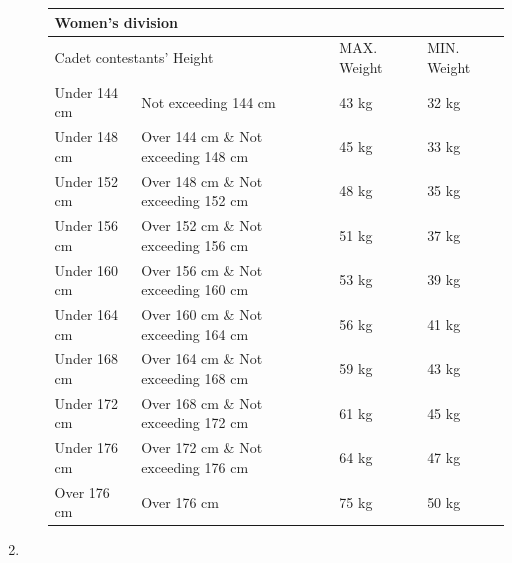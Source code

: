 \documentclass[draft]{report}
\begin{document}
\begin{enumerate}
\begin{enumerate}
    \begin{center}
    \begin{tabular}{ |l|l|l|l| } 
     \hline
     \multicolumn{4}{|l|}{Women's division} \\
     \hline
     \multicolumn{2}{|l|}{Cadet contestants' Height} & MAX. Weight & MIN. Weight  \\
     \hline
     Under 144 cm & Not exceeding 144 cm & 43 kg & 32 kg \\
     \hline
     Under 148 cm & Over 144 cm \& Not exceeding 148 cm & 45 kg & 33 kg \\
     \hline                                               
     Under 152 cm & Over 148 cm \& Not exceeding 152 cm & 48 kg & 35 kg \\
     \hline                                                       
     Under 156 cm & Over 152 cm \& Not exceeding 156 cm & 51 kg & 37 kg \\
     \hline                                                       
     Under 160 cm & Over 156 cm \& Not exceeding 160 cm & 53 kg & 39 kg \\
     \hline                                                       
     Under 164 cm & Over 160 cm \& Not exceeding 164 cm & 56 kg & 41 kg \\
     \hline                                                       
     Under 168 cm & Over 164 cm \& Not exceeding 168 cm & 59 kg & 43 kg \\
     \hline                                                       
     Under 172 cm & Over 168 cm \& Not exceeding 172 cm & 61 kg & 45 kg \\
     \hline                                                               
     Under 176 cm & Over 172 cm \& Not exceeding 176 cm & 64 kg & 47 kg \\
     \hline                 
     Over 176 cm & Over 176 cm & 75 kg & 50 kg  \\
     \hline
    \end{tabular}
    \end{center}
  \end{enumerate}

\item



\end{enumerate}
\end{document}
